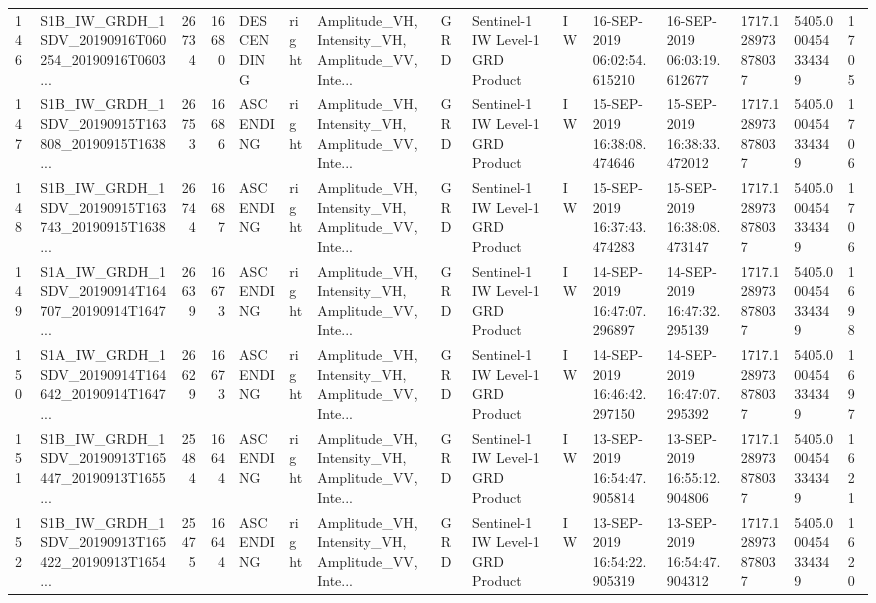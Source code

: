 \begin{tabular}{llrrlllllllllll}
146 &  S1B\_IW\_GRDH\_1SDV\_20190916T060254\_20190916T0603... &  26734 &   16680 &  DESCENDING &  right &  Amplitude\_VH, Intensity\_VH, Amplitude\_VV, Inte... &          GRD &  Sentinel-1 IW Level-1 GRD Product &              IW &  16-SEP-2019 06:02:54.615210 &  16-SEP-2019 06:03:19.612677 &          1717.128973878037 &  5405.000454334349 &       1705 \\
147 &  S1B\_IW\_GRDH\_1SDV\_20190915T163808\_20190915T1638... &  26753 &   16686 &   ASCENDING &  right &  Amplitude\_VH, Intensity\_VH, Amplitude\_VV, Inte... &          GRD &  Sentinel-1 IW Level-1 GRD Product &              IW &  15-SEP-2019 16:38:08.474646 &  15-SEP-2019 16:38:33.472012 &          1717.128973878037 &  5405.000454334349 &       1706 \\
148 &  S1B\_IW\_GRDH\_1SDV\_20190915T163743\_20190915T1638... &  26744 &   16687 &   ASCENDING &  right &  Amplitude\_VH, Intensity\_VH, Amplitude\_VV, Inte... &          GRD &  Sentinel-1 IW Level-1 GRD Product &              IW &  15-SEP-2019 16:37:43.474283 &  15-SEP-2019 16:38:08.473147 &          1717.128973878037 &  5405.000454334349 &       1706 \\
149 &  S1A\_IW\_GRDH\_1SDV\_20190914T164707\_20190914T1647... &  26639 &   16673 &   ASCENDING &  right &  Amplitude\_VH, Intensity\_VH, Amplitude\_VV, Inte... &          GRD &  Sentinel-1 IW Level-1 GRD Product &              IW &  14-SEP-2019 16:47:07.296897 &  14-SEP-2019 16:47:32.295139 &          1717.128973878037 &  5405.000454334349 &       1698 \\
150 &  S1A\_IW\_GRDH\_1SDV\_20190914T164642\_20190914T1647... &  26629 &   16673 &   ASCENDING &  right &  Amplitude\_VH, Intensity\_VH, Amplitude\_VV, Inte... &          GRD &  Sentinel-1 IW Level-1 GRD Product &              IW &  14-SEP-2019 16:46:42.297150 &  14-SEP-2019 16:47:07.295392 &          1717.128973878037 &  5405.000454334349 &       1697 \\
151 &  S1B\_IW\_GRDH\_1SDV\_20190913T165447\_20190913T1655... &  25484 &   16644 &   ASCENDING &  right &  Amplitude\_VH, Intensity\_VH, Amplitude\_VV, Inte... &          GRD &  Sentinel-1 IW Level-1 GRD Product &              IW &  13-SEP-2019 16:54:47.905814 &  13-SEP-2019 16:55:12.904806 &          1717.128973878037 &  5405.000454334349 &       1621 \\
152 &  S1B\_IW\_GRDH\_1SDV\_20190913T165422\_20190913T1654... &  25475 &   16644 &   ASCENDING &  right &  Amplitude\_VH, Intensity\_VH, Amplitude\_VV, Inte... &          GRD &  Sentinel-1 IW Level-1 GRD Product &              IW &  13-SEP-2019 16:54:22.905319 &  13-SEP-2019 16:54:47.904312 &          1717.128973878037 &  5405.000454334349 &       1620 \\

\end{tabular}
